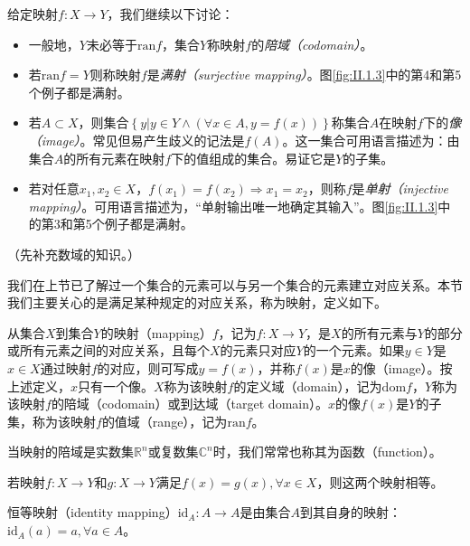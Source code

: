\documentclass[../main.tex]{subfiles}
\begin{document}
给定映射$f:X\rightarrow Y$，我们继续以下讨论：
\begin{itemize}
    \item 一般地，$Y$未必等于$\mathrm{ran}f$，集合$Y$称映射$f$的\emph{陪域（codomain）}。
    \item 若$\mathrm{ran}f=Y$则称映射$f$是\emph{满射（surjective mapping）}。图\ref{fig:II.1.3}中的第4和第5个例子都是满射。
    \item 若$A\subset X$，则集合$\left\{y|y\in Y\wedge\left(\forall x\in A,y=f\left(x\right)\right)\right\}$称集合$A$在映射$f$下的\emph{像（image）}。常见但易产生歧义的记法是$f\left(A\right)$。这一集合可用语言描述为：由集合$A$的所有元素在映射$f$下的值组成的集合。易证它是$Y$的子集。
    \item 若对任意$x_1,x_2\in X$，$f\left(x_1\right)=f\left(x_2\right)\Rightarrow x_1=x_2$，则称$f$是\emph{单射（injective mapping）}。可用语言描述为，“单射输出唯一地确定其输入”。图\ref{fig:II.1.3}中的第3和第5个例子都是满射。
\end{itemize}


（先补充数域的知识。）

我们在上节已了解过一个集合的元素可以与另一个集合的元素建立对应关系。本节我们主要关心的是满足某种规定的对应关系，称为映射，定义如下。

\begin{definition}[映射]
    从集合$X$到集合$Y$的映射（mapping）$f$，记为$f:X\rightarrow Y$，是$X$的所有元素与$Y$的部分或所有元素之间的对应关系，且每个$X$的元素只对应$Y$的一个元素。如果$y\in Y$是$x\in X$通过映射$f$的对应，则可写成$y=f\left(x\right)$，并称$f\left(x\right)$是$x$的像（image）。按上述定义，$x$只有一个像。$X$称为该映射$f$的定义域（domain），记为$\mathrm{dom}f$，$Y$称为该映射$f$的陪域（codomain）或到达域（target domain）。$x$的像$f\left(x\right)$是$Y$的子集，称为该映射$f$的值域（range），记为$\mathrm{ran}f$。
\end{definition}



当映射的陪域是实数集$\mathbb{R}^n$或复数集$\mathbb{C}^n$时，我们常常也称其为函数（function）。

\begin{definition}[映射的相等]
    若映射$f:X\rightarrow Y$和$g:X\rightarrow Y$满足$f\left(x\right)=g\left(x\right),\forall x\in X$，则这两个映射相等。
\end{definition}

\begin{definition}[恒等映射]
    恒等映射（identity mapping）$\mathrm{id}_A:A\rightarrow A$是由集合$A$到其自身的映射：$\mathrm{id}_A\left(a\right)=a,\forall a\in A$。
\end{definition}
\end{document}
